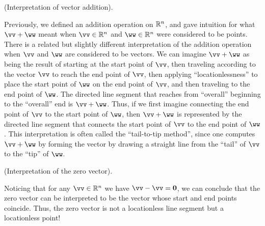 \begin{deriv}
    (Interpretation of vector addition).
    
    Previously, we defined an addition operation on $\mathbb{R}^n$, and gave intuition for what $\vv + \ww$ meant when $\vv \in \R^n$ and $\ww \in \R^n$ were considered to be points. There is a related but slightly different interpretation of the addition operation when $\vv$ and $\ww$ are considered to be vectors. We can imagine $\vv + \ww$ as being the result of starting at the start point of $\vv$, then traveling according to the vector $\vv$ to reach the end point of $\vv$, then applying ``locationlessness'' to place the start point of $\ww$ on the end point of $\vv$, and then traveling to the end point of $\ww$. The directed line segment that reaches from ``overall'' beginning to the ``overall'' end is $\vv + \ww$. Thus, if we first imagine connecting the end point of $\vv$ to the start point of $\ww$, then $\vv + \ww$ is represented by the directed line segment that connects the start point of $\vv$ to the end point of $\ww$. This interpretation is often called the ``tail-to-tip method'', since one computes $\vv + \ww$ by forming the vector by drawing a straight line from the ``tail'' of $\vv$ to the ``tip'' of $\ww$. 
\end{deriv}

\begin{deriv}
    (Interpretation of the zero vector).
    
    Noticing that for any $\vv \in \R^n$ we have $\vv - \vv = \mathbf{0}$, we can conclude that the zero vector can be interpreted to be the vector whose start and end points coincide. Thus, the zero vector is not a locationless line segment but a locationless point!
\end{deriv}

